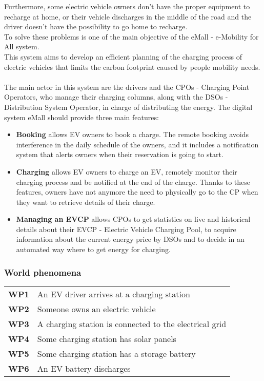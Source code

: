 Furthermore, some electric vehicle owners don't have the proper equipment to recharge at home, or their vehicle discharges in the middle of the road and the driver doesn't have the possibility to go home to recharge.\\
To solve these problems is one of the main objective of the eMall - e-Mobility for All system.\\
This system aims to develop an efficient planning of the charging process of electric vehicles that limits the carbon footprint caused by people mobility needs.\\\\
The main actor in this system are the drivers and the CPOs - Charging Point Operators, who manage their charging columns, along with the DSOs - Distribution System Operator, in charge of distributing the energy.
The digital system eMall should provide three main features:
\begin{itemize}
    \item \textbf{Booking} allows EV owners to book a charge. The remote booking avoids interference
          in the daily schedule of the owners, and it includes a notification
          system that alerts owners when their reservation is going to start.
    \item \textbf{Charging} allows EV owners to charge an EV, remotely monitor their charging
          process and be notified at the end of the charge.
          Thanks to these features, owners have not anymore the need to
          physically go to the CP when they want to retrieve details of their charge.
    \item  \textbf{Managing an EVCP} allows CPOs to get statistics on live and historical details
          about their EVCP - Electric Vehicle Charging Pool, to acquire information about the current energy price by
          DSOs and to decide in an automated way where to get energy for charging.
\end{itemize}




\subsubsection{World phenomena}
\begin{table}[H]
    \begin{tabularx}{\textwidth}{cX}
        \toprule
        \textbf{WP1} & An EV driver arrives at a charging station             \\
        \textbf{WP2} & Someone owns an electric vehicle                       \\
        \textbf{WP3} & A charging station is connected to the electrical grid \\
        \textbf{WP4} & Some charging station has solar panels                 \\
        \textbf{WP5} & Some charging station has a storage battery            \\
        \textbf{WP6} & An EV battery discharges                               \\ \bottomrule
    \end{tabularx}
\end{table}
